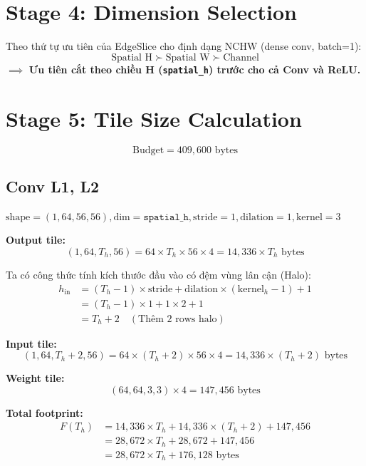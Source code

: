 \documentclass[11pt,a4paper]{article}
\begin{document}
\section{Stage 4: Dimension Selection}

Theo thứ tự ưu tiên của EdgeSlice cho định dạng NCHW (dense conv, batch=1):
$$\text{Spatial H} \succ \text{Spatial W} \succ \text{Channel}$$
$\implies$ \textbf{Ưu tiên cắt theo chiều H (\texttt{spatial\_h}) trước cho cả Conv và ReLU.}

\section{Stage 5: Tile Size Calculation}

$$\text{Budget} = 409,600\text{ bytes}$$

\subsection{Conv L1, L2}
$\text{shape} = (1, 64, 56, 56), \text{dim} = \texttt{spatial\_h}, \text{stride}=1, \text{dilation}=1, \text{kernel}=3$

\textbf{Output tile:}
$$(1, 64, T_h, 56) = 64 \times T_h \times 56 \times 4 = 14,336 \times T_h\text{ bytes}$$

Ta có công thức tính kích thước đầu vào có đệm vùng lân cận (Halo):
\begin{align*}
h_{\text{in}} &= (T_h - 1) \times \text{stride} + \text{dilation} \times (\text{kernel}_h - 1) + 1 \\
&= (T_h - 1) \times 1 + 1 \times 2 + 1 \\
&= T_h + 2 \quad (\text{Thêm 2 rows halo})
\end{align*}

\textbf{Input tile:}
$$(1, 64, T_h + 2, 56) = 64 \times (T_h + 2) \times 56 \times 4 = 14,336 \times (T_h + 2)\text{ bytes}$$

\textbf{Weight tile:}
$$(64, 64, 3, 3) \times 4 = 147,456\text{ bytes}$$

\textbf{Total footprint:}
\begin{align*}
F(T_h) &= 14,336 \times T_h + 14,336 \times (T_h + 2) + 147,456 \\
&= 28,672 \times T_h + 28,672 + 147,456 \\
&= 28,672 \times T_h + 176,128\text{ bytes}
\end{align*}
\end{document}
